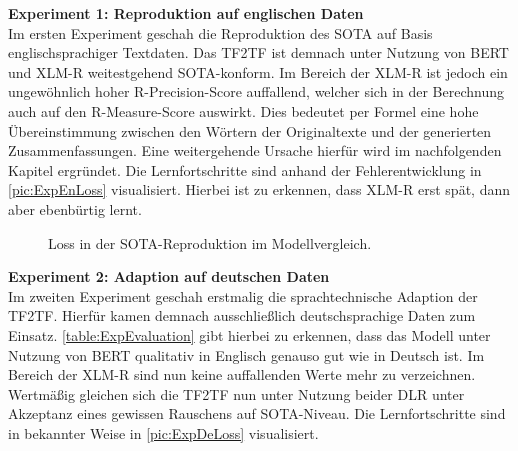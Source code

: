 \noindent
\textbf{Experiment 1: Reproduktion auf englischen Daten}\\
\noindent
Im ersten Experiment geschah die Reproduktion des \ac{SOTA} auf Basis englischsprachiger Textdaten. Das \ac{TF2TF} ist demnach unter Nutzung von \ac{BERT} und \ac{XLM-R} weitestgehend \ac{SOTA}-konform. Im Bereich der \ac{XLM-R} ist jedoch ein ungewöhnlich hoher R-Precision-Score auffallend, welcher sich in der Berechnung auch auf den R-Measure-Score auswirkt. Dies bedeutet per Formel eine hohe Übereinstimmung zwischen den Wörtern der Originaltexte und der generierten Zusammenfassungen. Eine weitergehende Ursache hierfür wird im nachfolgenden Kapitel ergründet. Die Lernfortschritte sind anhand der Fehlerentwicklung in \autoref{pic:ExpEnLoss} visualisiert. Hierbei ist zu erkennen, dass \ac{XLM-R} erst spät, dann aber ebenbürtig lernt.\\

\begin{figure}[h]
  \centering
  \caption{Loss in der SOTA-Reproduktion im Modellvergleich.}
  \label{pic:ExpEnLoss}
\end{figure}

\noindent
\textbf{Experiment 2: Adaption auf deutschen Daten}\\
\noindent
Im zweiten Experiment geschah erstmalig die sprachtechnische Adaption der \ac{TF2TF}. Hierfür kamen demnach ausschließlich deutschsprachige Daten zum Einsatz. \autoref{table:ExpEvaluation} gibt hierbei zu erkennen, dass das Modell unter Nutzung von \ac{BERT} qualitativ in Englisch genauso gut wie in Deutsch ist. Im Bereich der \ac{XLM-R} sind nun keine auffallenden Werte mehr zu verzeichnen. Wertmäßig gleichen sich die \ac{TF2TF} nun unter Nutzung beider \ac{DLR} unter Akzeptanz eines gewissen Rauschens auf \ac{SOTA}-Niveau. Die Lernfortschritte sind in bekannter Weise in \autoref{pic:ExpDeLoss} visualisiert.
\newpage

